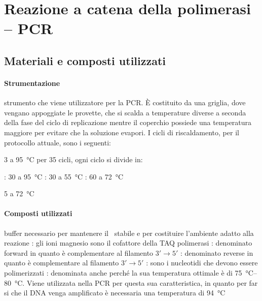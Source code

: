 \section{Reazione a catena della polimerasi -- PCR}

\subsection{Materiali e composti utilizzati}
\paragraph{Strumentazione}
\begin{itemize}[person]
	\itemb[Termociclatore:] strumento che viene utilizzatore per la PCR. È costituito da una griglia, dove vengano appoggiate le provette, che si scalda a temperature diverse a seconda della fase del ciclo di replicazione mentre il coperchio possiede una temperatura maggiore per evitare che la soluzione evapori.
	I cicli di riscaldamento, per il protocollo attuale, sono i seguenti:
	\begin{itemize}[squareItem]
		 \qty{3}{\min} a \qty{95}{\celsius}
		\itemb[Amplificazione] per 35 cicli, ogni ciclo si divide in:
		\begin{itemize}[squareItem]
			\itemb[Denaturazione]: \qty{30}{\sec} a \qty{95}{\celsius}
			\itemb[Ibridazione]: \qty{30}{\sec} a \qty{55}{\celsius}
			\itemb[Estensione]: \qty{60}{\sec} a \qty{72}{\celsius}
		\end{itemize}
		 \qty{5}{\min} a \qty{72}{\celsius}
	\end{itemize}
\end{itemize}

\paragraph{Composti utilizzati}
\begin{itemize}
	 buffer necessario per mantenere il \pH\ stabile e per costituire l'ambiente adatto alla reazione
	\itemb[\ch{MgCl2}]: gli ioni magnesio  sono il cofattore della TAQ polimerasi
	: denominato \foreignlanguage{english}{forward} in quanto è complementare al filamento \(3' \rightarrow 5'\)
	: denominato \foreignlanguage{english}{reverse} in quanto è complementare al filamento \(3' \rightarrow 5'\)
	\itemb[dNTPs]: sono i nucleotidi che devono essere polimerizzati
	: denominata anche  perché la sua temperatura ottimale è di \qtyrange{75}{80}{\celsius}. Viene utilizzata nella PCR per questa sua caratteristica, in quanto per far si che il DNA venga amplificato è necessaria una temperatura di \qty{94}{\celsius}
\end{itemize}

